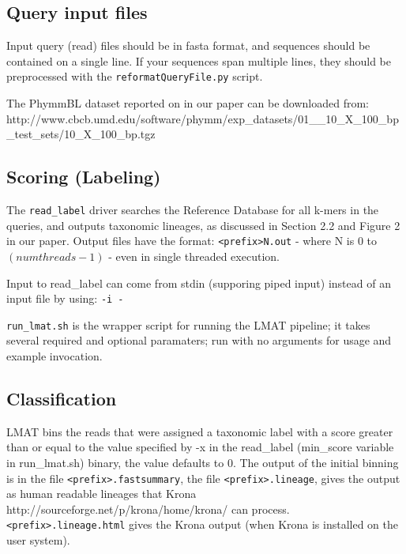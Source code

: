 \documentclass[11pt]{article}
\begin{document}
\subsection{Query input files}

Input query (read) files should be in fasta format, and sequences should
be contained on a single line. If your sequences span multiple lines,
they should be preprocessed with the \texttt{reformatQueryFile.py} script.

The PhymmBL dataset reported on in our paper can be downloaded from:\\
http://www.cbcb.umd.edu/software/phymm/exp\_datasets/01\_\_10\_X\_100\_bp\_test\_sets/10\_X\_100\_bp.tgz

\subsection{Scoring (Labeling)}

The \texttt{read\_label} driver searches the Reference Database for all k-mers 
in the queries, and outputs taxonomic lineages, as discussed in Section 2.2 and
Figure 2 in our paper.  Output files have the format: \texttt{<prefix>N.out} - where N is 0 to
$(numthreads-1)$ - even in single threaded execution.  

Input to read\_label can come from stdin (supporing piped input) instead of an input file by using: \texttt{-i -}


\texttt{run\_lmat.sh} is the wrapper script for running the LMAT pipeline; it takes several required 
and optional paramaters; run with no arguments for usage and example invocation.

\subsection{Classification}

LMAT bins the reads that were assigned a taxonomic label with a score greater than or equal to the value specified by -x in the read_label (min_score variable in run\_lmat.sh) binary, the value defaults to 0.
The output of the initial binning is in the file \texttt{<prefix>.fastsummary}, the file \texttt{<prefix>.lineage}, gives the output as human readable lineages that Krona {http://sourceforge.net/p/krona/home/krona/}
can process. \texttt{<prefix>.lineage.html} gives the Krona output (when Krona is installed on the user system).
\end{document}
